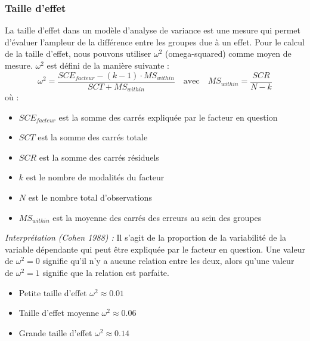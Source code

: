 \documentclass[12pt,a4paper]{article}
\begin{document}
	\subsubsection{Taille d'effet}
	La taille d'effet dans un modèle d'analyse de variance est une mesure qui permet d'évaluer l'ampleur de la différence entre les groupes due à un effet.
	Pour le calcul de la taille d'effet, nous pouvons utiliser $\omega^2$ (omega-squared) comme moyen de mesure.
	$\omega^2$ est défini de la manière suivante : 
	\begin{equation}
		\omega^2 = \frac{SCE_{facteur} - (k-1)\cdot MS_{within}}{SCT + MS_{within}} \quad \text{avec} \quad MS_{within} = \frac{SCR}{N-k}
	\end{equation}    
	où : 
	\begin{itemize}
		\item $SCE_{facteur}$ est la somme des carrés expliquée par le facteur en question
		\item $SCT$ est la somme des carrés totale
		\item $SCR$ est la somme des carrés résiduels
		\item $k$ est le nombre de modalités du facteur
		\item $N$ est le nombre total d'observations
		\item $MS_{within}$ est la moyenne des carrés des erreurs au sein des groupes 
	\end{itemize}
	\textit{Interprétation (Cohen 1988) :}
	Il s'agit de la proportion de la variabilité de la variable dépendante qui peut être expliquée par le facteur en question. Une valeur de $\omega^2 = 0$ signifie qu'il n'y a aucune relation entre les deux, alors qu'une valeur de $\omega^2 = 1$ signifie que la relation est parfaite.
	\begin{itemize}
		\item Petite taille d'effet $\omega^2 \approx 0.01$
		\item Taille d'effet moyenne $\omega^2 \approx 0.06$
		\item Grande taille d'effet $\omega^2 \approx 0.14$
	\end{itemize}
	
\end{document}
